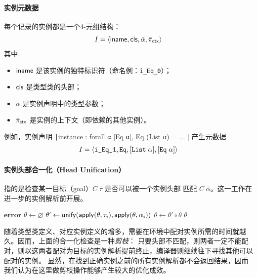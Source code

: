 \documentclass[a4paper, 11pt]{article}
\theoremstyle{remark}\newtheorem*{remark}{Remark}
\theoremstyle{definition}\newtheorem*{definition}{Definition}
\begin{document}
\paragraph{实例元数据} 每个记录的实例都是一个4-元组结构：
\[
  I = \langle \mathsf{iname}, \mathsf{cls},\bar{\alpha},\bar{\pi}_{\mathsf{ctx}} \rangle
\]
其中
\begin{itemize}
  \item \(\mathsf{iname}\) 是该实例的独特标识符（命名例：\texttt{i\_Eq\_0}）；
  \item \(\mathsf{cls}\) 是类型类的头部；
  \item \(\bar{\alpha}\) 是实例声明中的类型参数；
  \item \(\bar{\pi}_{\mathsf{ctx}}\) 是实例的上下文（即依赖的其他实例）。
\end{itemize}
例如，实例声明 \texttt|instance : forall α [Eq α], Eq (List α) = ... | 产生元数据
\[
  I = \langle \texttt{i\_Eq\_1}, \texttt{Eq}, [\texttt{List}\;\alpha], [\texttt{Eq}\;\alpha] \rangle
\]

\paragraph{实例头部合一化（Head Unification）} 指的是检查某一目标（goal）\(C\;\bar{\tau}\) 是否可以被一个实例头部
匹配 \(C\;\bar\alpha\)。这一工作在进一步的实例解析前开展。

\begin{algorithm}[H]
  \caption{Head Unification}
  \begin{algorithmic}[1]
    \State \Return $\mathbf{error}$
    \EndIf
    \State $\theta \gets \varnothing$
    \State $\theta' \gets \mathsf{unify}(\mathsf{apply}(\theta, \tau_i), \mathsf{apply}(\theta, \alpha_i))$
    \State $\theta \gets \theta' \circ \theta$
    \EndFor
    \State \Return $\theta$
    \EndFunction
  \end{algorithmic}
\end{algorithm}

随着类型类定义、对应实例定义的增多，需要在环境中配对实例所需的时间就越久。因而，上面的合一化检查是一种\emph{剪枝}：
只要头部不匹配，则两者一定不能配对，则以这两者配对为目标的实例解析提前终止，编译器则继续往下寻找其他可以配对的实例。
显然，在找到正确实例之前的所有实例解析都不会返回结果，因而我们认为在这里做剪枝操作能够产生较大的优化成效。
\end{document}
